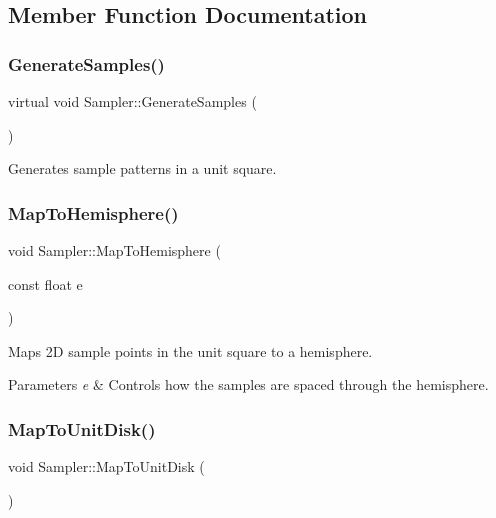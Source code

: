 \subsection{Member Function Documentation}
\hypertarget{class_sampler_a3b75766bf339671a64a05ea9d25cd290}{}\label{class_sampler_a3b75766bf339671a64a05ea9d25cd290} 
\subsubsection{\texorpdfstring{Generate\+Samples()}{GenerateSamples()}}
{\footnotesize\ttfamily virtual void Sampler\+::\+Generate\+Samples (\begin{DoxyParamCaption}{ }\end{DoxyParamCaption})\hspace{0.3cm}{\ttfamily [pure virtual]}}

Generates sample patterns in a unit square. \hypertarget{class_sampler_aecad935bae132f108453f9ee5b3d6993}{}\label{class_sampler_aecad935bae132f108453f9ee5b3d6993} 
\subsubsection{\texorpdfstring{Map\+To\+Hemisphere()}{MapToHemisphere()}}
{\footnotesize\ttfamily void Sampler\+::\+Map\+To\+Hemisphere (\begin{DoxyParamCaption}\item[{const float}]{e }\end{DoxyParamCaption})}

Maps 2D sample points in the unit square to a hemisphere. 
\begin{DoxyParams}{Parameters}
{\em e} & Controls how the samples are spaced through the hemisphere. \\
\hline
\end{DoxyParams}
\hypertarget{class_sampler_ab6efd9686bab476dbdacbf7922711a45}{}\label{class_sampler_ab6efd9686bab476dbdacbf7922711a45} 
\subsubsection{\texorpdfstring{Map\+To\+Unit\+Disk()}{MapToUnitDisk()}}
{\footnotesize\ttfamily void Sampler\+::\+Map\+To\+Unit\+Disk (\begin{DoxyParamCaption}{ }\end{DoxyParamCaption})}

